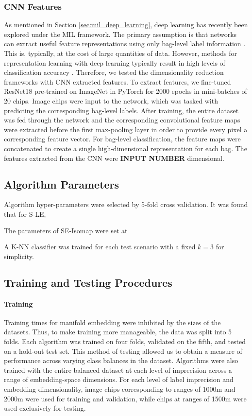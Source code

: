 \subsubsection{CNN Features}
As mentioned in Section \ref{sec:mil_deep_learning}, deep learning has recently been explored under the MIL framework.  The primary assumption is that networks can extract useful feature representations using only bag-level label information \citep{Ghaffarzadegan2018MILVAE}.  This is, typically, at the cost of large quantities of data.  However, methods for representation learning with deep learning typically result in high levels of classification accuracy \citep{Bengio2014RepLearningReview}.  Therefore, we tested the dimensionality reduction frameworks with CNN extracted features.  To extract features, we fine-tuned ResNet18 \citep{He2015ResNet} pre-trained on ImageNet \citep{Deng2009ImageNet} in PyTorch for 2000 epochs in mini-batches of 20 chips.  Image chips were input to the network, which was tasked with predicting the corresponding bag-level labels.  After training, the entire dataset was fed through the network and the corresponding convolutional feature maps were extracted before the first max-pooling layer in order to provide every pixel a corresponding feature vector.  For bag-level classification, the feature maps were concatenated to create a single high-dimensional representation for each bag.  The features extracted from the CNN were \textbf{INPUT NUMBER} dimensional.

\subsection{Algorithm Parameters}
Algorithm hyper-parameters were selected by 5-fold cross validation.  It was found that for S-LE, 

The parameters of SE-Isomap were set at

A K-NN classifier was trained for each test scenario with a fixed $k=3$ for simplicity.  

\subsection{Training and Testing Procedures}

\paragraph{Training}
Training times for manifold embedding were inhibited by the sizes of the datasets.  Thus, to make training more manageable, the data was split into 5 folds.  Each algorithm was trained on four folds, validated on the fifth, and tested on a hold-out test set.  This method of testing allowed us to obtain a measure of performance across varying class balances in the dataset.  Algorithms were also trained with the entire balanced dataset at each level of imprecision across a range of embedding-space dimensions.  For each level of label imprecision and embedding dimensionality, image chips corresponding to ranges of 1000m and 2000m were used for training and validation, while chips at ranges of 1500m were used exclusively for testing.


